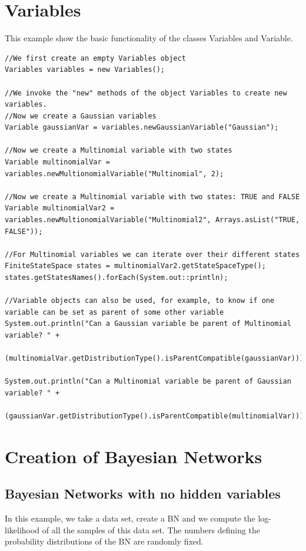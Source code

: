 \section{Variables}


This example show the basic functionality of the classes Variables and Variable.

\begin{lstlisting}
//We first create an empty Variables object
Variables variables = new Variables();

//We invoke the "new" methods of the object Variables to create new variables.
//Now we create a Gaussian variables
Variable gaussianVar = variables.newGaussianVariable("Gaussian");

//Now we create a Multinomial variable with two states
Variable multinomialVar = variables.newMultionomialVariable("Multinomial", 2);

//Now we create a Multinomial variable with two states: TRUE and FALSE
Variable multinomialVar2 = variables.newMultionomialVariable("Multinomial2", Arrays.asList("TRUE, FALSE"));

//For Multinomial variables we can iterate over their different states
FiniteStateSpace states = multinomialVar2.getStateSpaceType();
states.getStatesNames().forEach(System.out::println);

//Variable objects can also be used, for example, to know if one variable can be set as parent of some other variable
System.out.println("Can a Gaussian variable be parent of Multinomial variable? " +
        (multinomialVar.getDistributionType().isParentCompatible(gaussianVar)));

System.out.println("Can a Multinomial variable be parent of Gaussian variable? " +
        (gaussianVar.getDistributionType().isParentCompatible(multinomialVar)));
\end{lstlisting}



\section{Creation of Bayesian Networks}


\subsection{Bayesian Networks with no hidden variables}

In this example, we take a data set, create a BN and we compute the log-likelihood of all the samples
of this data set. The numbers defining the probability distributions of the BN are randomly fixed.


